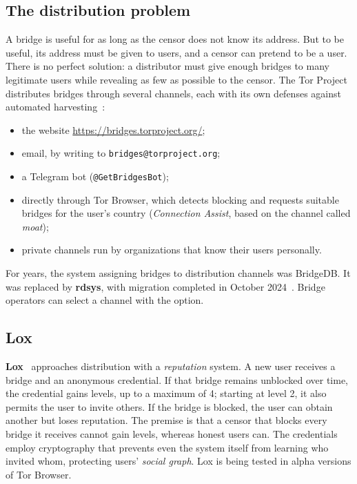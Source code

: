 \subsection{The distribution problem}

A bridge is useful for as long as the censor does not know its address. But to be useful, its address must be given to users, and a censor can pretend to be a user. There is no perfect solution: a distributor must give enough bridges to many legitimate users while revealing as few as possible to the censor. The Tor Project distributes bridges through several channels, each with its own defenses against automated harvesting~\cite{torsupport}:
\begin{itemize}
  \item the website \url{https://bridges.torproject.org/};
  \item email, by writing to \texttt{bridges@torproject.org};
  \item a Telegram bot (\texttt{@GetBridgesBot});
  \item directly through Tor Browser, which detects blocking and requests suitable bridges for the user's country (\emph{Connection Assist}, based on the channel called \emph{moat});
  \item private channels run by organizations that know their users personally.
\end{itemize}
For years, the system assigning bridges to distribution channels was BridgeDB. It was replaced by \textbf{rdsys}, with migration completed in October 2024~\cite{torblogrdsys}. Bridge operators can select a channel with the  option.

\subsection{Lox}

\textbf{Lox}~\cite{tulloch2023lox} approaches distribution with a \emph{reputation} system. A new user receives a bridge and an anonymous credential. If that bridge remains unblocked over time, the credential gains levels, up to a maximum of 4; starting at level 2, it also permits the user to invite others. If the bridge is blocked, the user can obtain another but loses reputation. The premise is that a censor that blocks every bridge it receives cannot gain levels, whereas honest users can. The credentials employ cryptography that prevents even the system itself from learning who invited whom, protecting users' \emph{social graph}. Lox is being tested in alpha versions of Tor Browser.

